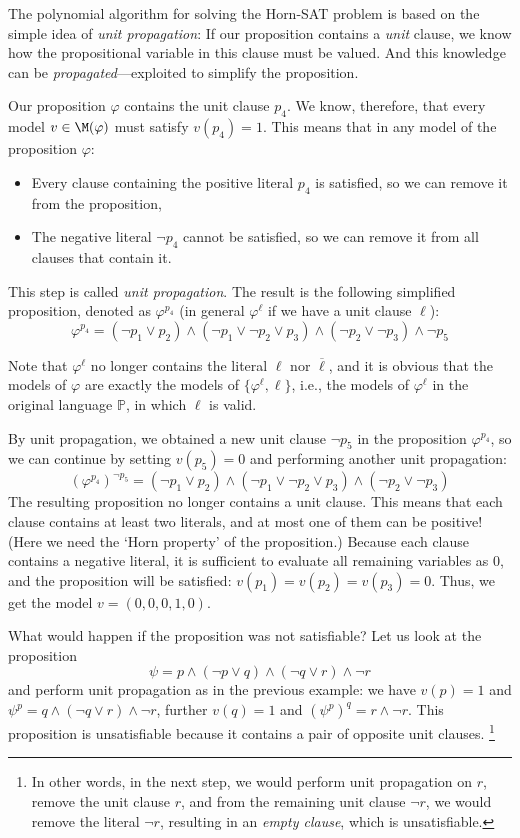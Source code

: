 The polynomial algorithm for solving the Horn-SAT problem is based on the simple idea of \emph{unit propagation}: If our proposition contains a \emph{unit} clause, we know how the propositional variable in this clause must be valued. And this knowledge can be \emph{propagated}---exploited to simplify the proposition.

Our proposition $\varphi$ contains the unit clause $p_4$. We know, therefore, that every model $v\in\M(\varphi)$ must satisfy $v(p_4)=1$. This means that in any model of the proposition $\varphi$:
\begin{itemize}
    \item Every clause containing the positive literal $p_4$ is satisfied, so we can remove it from the proposition,
    \item The negative literal $\neg p_4$ cannot be satisfied, so we can remove it from all clauses that contain it.
\end{itemize}
This step is called \emph{unit propagation}. The result is the following simplified proposition, denoted as $\varphi^{p_4}$ (in general $\varphi^\ell$ if we have a unit clause $\ell$):
$$
\varphi^{p_4}=(\neg p_1\lor p_2)\land(\neg p_1\lor\neg p_2\lor p_3)\land (\neg p_2\lor\neg p_3)\land\neg p_5
$$
\begin{observation}
Note that $\varphi^\ell$ no longer contains the literal $\ell$ nor $\overline{\ell}$, and it is obvious that the models of $\varphi$ are exactly the models of $\{\varphi^{\ell},\ell\}$, i.e., the models of $\varphi^{\ell}$ in the original language $\mathbb P$, in which $\ell$ is valid.
\end{observation}

By unit propagation, we obtained a new unit clause $\neg p_5$ in the proposition $\varphi^{p_4}$, so we can continue by setting $v(p_5)=0$ and performing another unit propagation:
$$
(\varphi^{p_4})^{\neg p_5}=(\neg p_1\lor p_2)\land(\neg p_1\lor\neg p_2\lor p_3)\land(\neg p_2\lor\neg p_3)
$$
The resulting proposition no longer contains a unit clause. This means that each clause contains at least two literals, and at most one of them can be positive! (Here we need the `Horn property' of the proposition.) Because each clause contains a negative literal, it is sufficient to evaluate all remaining variables as 0, and the proposition will be satisfied: $v(p_1)=v(p_2)=v(p_3)=0$. Thus, we get the model $v=(0,0,0,1,0)$.

\begin{example}
    What would happen if the proposition was not satisfiable? Let us look at the proposition 
    $$
    \psi=p\land (\neg p\lor q)\land (\neg q\lor r)\land\neg r
    $$ 
    and perform unit propagation as in the previous example: we have $v(p)=1$ and 
$\psi^p=q\land (\neg q\lor r)\land\neg r$, further $v(q)=1$ and $(\psi^p)^q=r\land\neg r$. 
This proposition is unsatisfiable because it contains a pair of opposite unit clauses. \footnote{In other words, in the next step, we would perform unit propagation on $r$, remove the unit clause $r$, and from the remaining unit clause $\neg r$, we would remove the literal $\neg r$, resulting in an \emph{empty clause}, which is unsatisfiable.}
\end{example}

